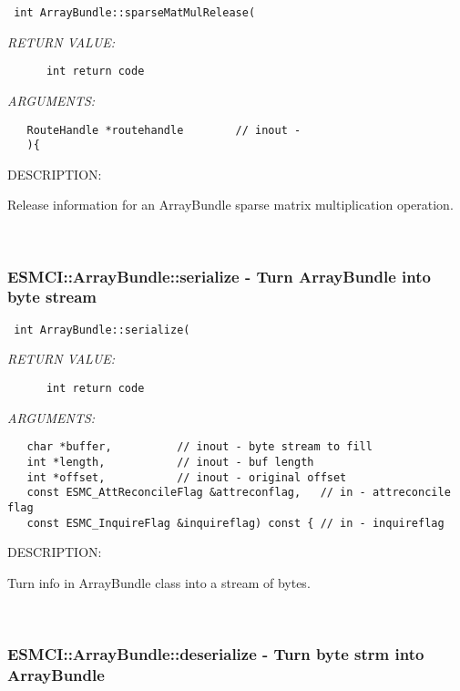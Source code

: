   
\begin{verbatim} int ArrayBundle::sparseMatMulRelease(\end{verbatim}{\em RETURN VALUE:}
\begin{verbatim}      int return code\end{verbatim}{\em ARGUMENTS:}
\begin{verbatim}   RouteHandle *routehandle        // inout -
   ){    \end{verbatim}
{\sf DESCRIPTION:\\ }


      Release information for an ArrayBundle sparse matrix multiplication
      operation.
   
 
\mbox{}\hrulefill\
 
\subsubsection [ESMCI::ArrayBundle::serialize] {ESMCI::ArrayBundle::serialize - Turn ArrayBundle into byte stream}


  
\begin{verbatim} int ArrayBundle::serialize(\end{verbatim}{\em RETURN VALUE:}
\begin{verbatim}      int return code\end{verbatim}{\em ARGUMENTS:}
\begin{verbatim}   char *buffer,          // inout - byte stream to fill
   int *length,           // inout - buf length
   int *offset,           // inout - original offset
   const ESMC_AttReconcileFlag &attreconflag,   // in - attreconcile flag
   const ESMC_InquireFlag &inquireflag) const { // in - inquireflag\end{verbatim}
{\sf DESCRIPTION:\\ }


      Turn info in ArrayBundle class into a stream of bytes.
   
 
\mbox{}\hrulefill\
 
\subsubsection [ESMCI::ArrayBundle::deserialize] {ESMCI::ArrayBundle::deserialize - Turn byte strm into ArrayBundle}



